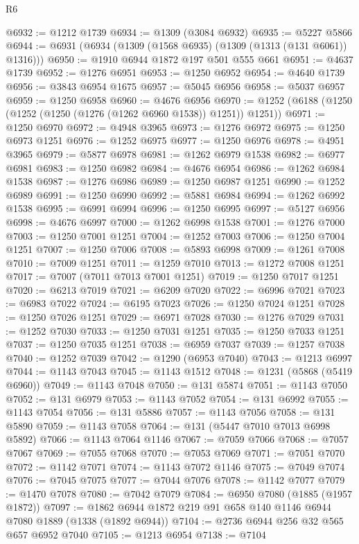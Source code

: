 \begin{lexlean}{R6}
\begin{coremodule}
@6932 := @1212 @1739
@6934 := @1309 (@3084 @6932)
@6935 := @5227 @5866
@6944 := @6931 (@6934 (@1309 (@1568 @6935) (@1309 (@1313 (@131 @6061)) @1316)))
@6950 := @1910 @6944 @1872 @197 @501 @555 @661
@6951 := @4637 @1739
@6952 := @1276 @6951
@6953 := @1250 @6952
@6954 := @4640 @1739
@6956 := @3843 @6954 @1675
@6957 := @5045 @6956
@6958 := @5037 @6957
@6959 := @1250 @6958
@6960 := @4676 @6956
@6970 := @1252 (@6188 (@1250 (@1252 (@1250 (@1276 (@1262 @6960 @1538)) @1251)) @1251))
@6971 := @1250 @6970
@6972 := @4948 @3965
@6973 := @1276 @6972
@6975 := @1250 @6973 @1251
@6976 := @1252 @6975
@6977 := @1250 @6976
@6978 := @4951 @3965
@6979 := @5877 @6978
@6981 := @1262 @6979 @1538
@6982 := @6977 @6981
@6983 := @1250 @6982
@6984 := @4676 @6954
@6986 := @1262 @6984 @1538
@6987 := @1276 @6986
@6989 := @1250 @6987 @1251
@6990 := @1252 @6989
@6991 := @1250 @6990
@6992 := @5881 @6984
@6994 := @1262 @6992 @1538
@6995 := @6991 @6994
@6996 := @1250 @6995
@6997 := @5127 @6956
@6998 := @4676 @6997
@7000 := @1262 @6998 @1538
@7001 := @1276 @7000
@7003 := @1250 @7001 @1251
@7004 := @1252 @7003
@7006 := @1250 @7004 @1251
@7007 := @1250 @7006
@7008 := @5893 @6998
@7009 := @1261 @7008
@7010 := @7009 @1251
@7011 := @1259 @7010
@7013 := @1272 @7008 @1251
@7017 := @7007 (@7011 @7013 @7001 @1251)
@7019 := @1250 @7017 @1251
@7020 := @6213 @7019
@7021 := @6209 @7020
@7022 := @6996 @7021
@7023 := @6983 @7022
@7024 := @6195 @7023
@7026 := @1250 @7024 @1251
@7028 := @1250 @7026 @1251
@7029 := @6971 @7028
@7030 := @1276 @7029
@7031 := @1252 @7030
@7033 := @1250 @7031 @1251
@7035 := @1250 @7033 @1251
@7037 := @1250 @7035 @1251
@7038 := @6959 @7037
@7039 := @1257 @7038
@7040 := @1252 @7039
@7042 := @1290 (@6953 @7040)
@7043 := @1213 @6997
@7044 := @1143 @7043
@7045 := @1143 @1512
@7048 := @1231 (@5868 (@5419 @6960))
@7049 := @1143 @7048
@7050 := @131 @5874
@7051 := @1143 @7050
@7052 := @131 @6979
@7053 := @1143 @7052
@7054 := @131 @6992
@7055 := @1143 @7054
@7056 := @131 @5886
@7057 := @1143 @7056
@7058 := @131 @5890
@7059 := @1143 @7058
@7064 := @131 (@5447 @7010 @7013 @6998 @5892)
@7066 := @1143 @7064 @1146
@7067 := @7059 @7066
@7068 := @7057 @7067
@7069 := @7055 @7068
@7070 := @7053 @7069
@7071 := @7051 @7070
@7072 := @1142 @7071
@7074 := @1143 @7072 @1146
@7075 := @7049 @7074
@7076 := @7045 @7075
@7077 := @7044 @7076
@7078 := @1142 @7077
@7079 := @1470 @7078
@7080 := @7042 @7079
@7084 := @6950 @7080 (@1885 (@1957 @1872))
@7097 := @1862 @6944 @1872 @219 @91 @658 @140 @1146 @6944 @7080 @1889 (@1338 (@1892 @6944))
@7104 := @2736 @6944 @256 @32 @565 @657 @6952 @7040
@7105 := @1213 @6954
@7138 := @7104

\end{coremodule}
\end{lexlean}
